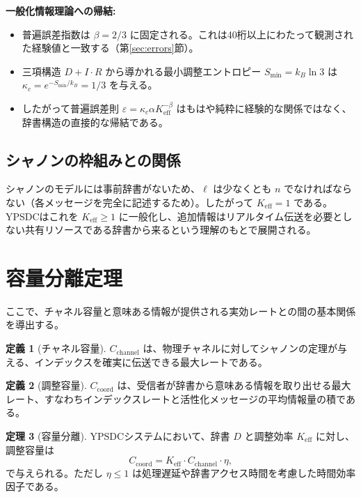 \documentclass[12pt,a4paper]{article}
\theoremstyle{definition}
\newtheorem{theorem}{定理}[section]
\newtheorem{definition}[theorem]{定義}
\theoremstyle{remark}
\newcommand{\Keff}{K_{\mathrm{eff}}}
\begin{document}
	\textbf{一般化情報理論への帰結:}
	\begin{itemize}
		\item 普遍誤差指数は $\beta = 2/3$ に固定される。これは40桁以上にわたって観測された経験値と一致する（第\ref{sec:errors}節）。
		\item 三項構造 $D+I\!\cdot\!R$ から導かれる最小調整エントロピー $S_{\min} = k_B \ln 3$ は $\kappa_c = e^{-S_{\min}/k_B} = 1/3$ を与える。
		\item したがって普遍誤差則 $\varepsilon = \kappa_c \alpha K_{\mathrm{eff}}^{-\beta}$ はもはや純粋に経験的な関係ではなく、辞書構造の直接的な帰結である。
	\end{itemize}
	
	\subsection{シャノンの枠組みとの関係}
	
	シャノンのモデルには事前辞書がないため、$\ell$ は少なくとも $n$ でなければならない（各メッセージを完全に記述するため）。したがって $\Keff = 1$ である。YPSDCはこれを $\Keff \ge 1$ に一般化し、追加情報はリアルタイム伝送を必要としない共有リソースである辞書から来るという理解のもとで展開される。
	
	\section{容量分離定理}
	\label{sec:separation}
	
	ここで、チャネル容量と意味ある情報が提供される実効レートとの間の基本関係を導出する。
	
	\begin{definition}[チャネル容量]
		$C_{\text{channel}}$ は、物理チャネルに対してシャノンの定理が与える、インデックスを確実に伝送できる最大レートである。
	\end{definition}
	
	\begin{definition}[調整容量]
		$C_{\text{coord}}$ は、受信者が辞書から意味ある情報を取り出せる最大レート、すなわちインデックスレートと活性化メッセージの平均情報量の積である。
	\end{definition}
	
	\begin{theorem}[容量分離]
		YPSDCシステムにおいて、辞書 $D$ と調整効率 $\Keff$ に対し、調整容量は
		\begin{equation}
			C_{\text{coord}} = \Keff \cdot C_{\text{channel}} \cdot \eta,
			\label{eq:capacity-separation}
		\end{equation}
		で与えられる。ただし $\eta \le 1$ は処理遅延や辞書アクセス時間を考慮した時間効率因子である。
	\end{theorem}
	
\end{document}
